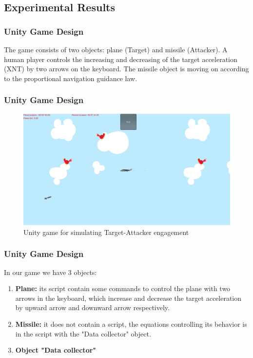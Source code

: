 \documentclass{beamer}
\begin{document}
\subsection{Experimental Results}
\begin{frame}
\frametitle{Unity Game Design}
The game consists of two objects: plane (Target) and missile (Attacker). A human player controls the increasing and decreasing of the target acceleration (XNT) by two arrows on the keyboard. The missile object is moving on according to the proportional navigation guidance law.
\end{frame}
\begin{frame}
\frametitle{Unity Game Design}
 \begin{figure}[H]
	\centering
	\includegraphics[scale = 0.2]{fig/unityGame.PNG}
	\caption{Unity game for simulating Target-Attacker engagement}
	\label{UnityGame}
\end{figure}
\end{frame}
\begin{frame}
\frametitle{Unity Game Design}
In our game we have 3 objects:
\begin{enumerate}
	\item \textbf{Plane:} its script contain some commands to control the plane with two arrows in the keyboard, which increase and decrease the target acceleration by upward arrow and downward arrow respectively. 
	\item \textbf{Missile:} it does not contain a script, the equations controlling its behavior is in the script with the "Data collector" object.
	\item \textbf{Object "Data collector"}
\end{enumerate} 
\end{frame}
\end{document}
